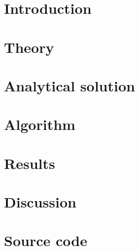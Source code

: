 \documentclass[a4paper, 12pt, english]{article}
\author{Kristoffer Brækken, Vedad Hodzic, Paul Magnus Sørensen-Clark}
\begin{document}
\begin{titlepage}
    \thispagestyle{empty}
    
\end{titlepage}

\begin{abstract}
    \lipsum[1]
\end{abstract}

\section{Introduction}


\section{Theory}

\section{Analytical solution}


\section{Algorithm}


\section{Results}

\section{Discussion}

\section{Source code}
\end{document}
